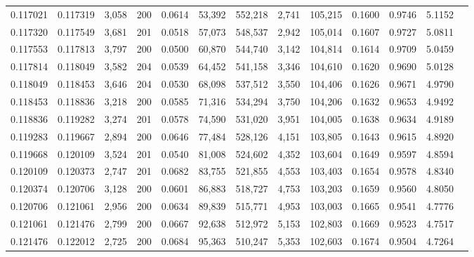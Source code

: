 \begin{tabular}{rrrrrrrrrrrrr}
0.117021 & 0.117319 & 3,058 & 200 &                                     0.0614 &  53,392 & 552,218 &   2,741 & 105,215 & 0.1600 & 0.9746 & 5.1152 \\
0.117320 & 0.117549 & 3,681 & 201 &                                     0.0518 &  57,073 & 548,537 &   2,942 & 105,014 & 0.1607 & 0.9727 & 5.0811 \\
0.117553 & 0.117813 & 3,797 & 200 &                                     0.0500 &  60,870 & 544,740 &   3,142 & 104,814 & 0.1614 & 0.9709 & 5.0459 \\
0.117814 & 0.118049 & 3,582 & 204 &                                     0.0539 &  64,452 & 541,158 &   3,346 & 104,610 & 0.1620 & 0.9690 & 5.0128 \\
0.118049 & 0.118453 & 3,646 & 204 &                                     0.0530 &  68,098 & 537,512 &   3,550 & 104,406 & 0.1626 & 0.9671 & 4.9790 \\
0.118453 & 0.118836 & 3,218 & 200 &                                     0.0585 &  71,316 & 534,294 &   3,750 & 104,206 & 0.1632 & 0.9653 & 4.9492 \\
0.118836 & 0.119282 & 3,274 & 201 &                                     0.0578 &  74,590 & 531,020 &   3,951 & 104,005 & 0.1638 & 0.9634 & 4.9189 \\
0.119283 & 0.119667 & 2,894 & 200 &                                     0.0646 &  77,484 & 528,126 &   4,151 & 103,805 & 0.1643 & 0.9615 & 4.8920 \\
0.119668 & 0.120109 & 3,524 & 201 &                                     0.0540 &  81,008 & 524,602 &   4,352 & 103,604 & 0.1649 & 0.9597 & 4.8594 \\
0.120109 & 0.120373 & 2,747 & 201 &                                     0.0682 &  83,755 & 521,855 &   4,553 & 103,403 & 0.1654 & 0.9578 & 4.8340 \\
0.120374 & 0.120706 & 3,128 & 200 &                                     0.0601 &  86,883 & 518,727 &   4,753 & 103,203 & 0.1659 & 0.9560 & 4.8050 \\
0.120706 & 0.121061 & 2,956 & 200 &                                     0.0634 &  89,839 & 515,771 &   4,953 & 103,003 & 0.1665 & 0.9541 & 4.7776 \\
0.121061 & 0.121476 & 2,799 & 200 &                                     0.0667 &  92,638 & 512,972 &   5,153 & 102,803 & 0.1669 & 0.9523 & 4.7517 \\
0.121476 & 0.122012 & 2,725 & 200 &                                     0.0684 &  95,363 & 510,247 &   5,353 & 102,603 & 0.1674 & 0.9504 & 4.7264 \\

\end{tabular}

